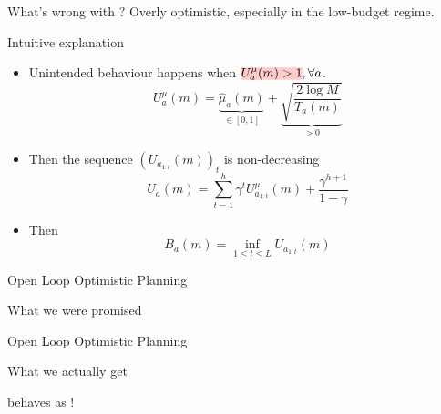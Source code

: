 \documentclass{beamer}
\begin{document}
\begin{frame}{What's wrong with \OLOP?}
    Overly optimistic, especially in the low-budget regime.

    \begin{alertblock}{Intuitive explanation}
    \begin{itemize}
        \item Unintended behaviour happens when $\hler{U^{\mu}_a(m) > 1}, \forall a$.
    \begin{equation*}
         U^{\mu}_a(m) = \underbrace{\hat{\mu}_a(m)}_{\in [0,1]} + \underbrace{\sqrt{\frac{2 \log M}{T_a(m)}}}_{> 0}
    \end{equation*}
        \item Then the sequence $(U_{a_{1:t}}(m))_t$ is non-decreasing
    \begin{equation*}
    U_a(m) = \sum_{t=1}^h \gamma^t U^{\mu}_{a_{1:t}}(m) + \frac{\gamma^{h+1}}{1-\gamma}
    \end{equation*}
        \item Then 
    \begin{equation*}
    B_a(m) = \inf_{1 \leq t \leq L} U_{a_{1:t}}(m)
    \end{equation*}
    \end{itemize}
    \end{alertblock}
    
\end{frame}

\begin{frame}{Open Loop Optimistic Planning}
\begin{block}{What we were promised}
\begin{center}

\end{center}
\end{block}
\end{frame}

\begin{frame}{Open Loop Optimistic Planning}
\begin{block}{What we actually get}
\begin{center}

\end{center}
\end{block}
\begin{flushright}
\OLOP behaves as !
\end{flushright}
\end{frame}
\end{document}

